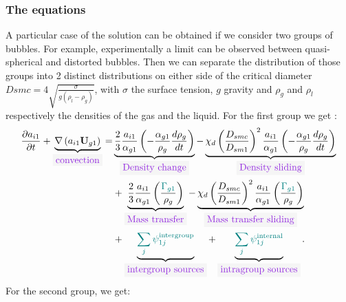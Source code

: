 \subsubsection{The equations}
A particular case of the solution can be obtained if we consider two groups of bubbles. For example, experimentally a limit can be observed between quasi-spherical and distorted bubbles. Then we can separate the distribution of those groups into 2 distinct distributions on either side of the critical diameter $Dsmc=4\sqrt{\tfrac{\sigma}{g(\rho_l-\rho_g)}}$, with $\sigma$ the surface tension, $g$ gravity and $\rho_g$ and $\rho_l$ respectively the densities of the gas and the liquid. For the first group we get :
\begin{equation}
\begin{aligned}
\frac{\partial a_{i1}}{\partial t}+\underbrace{\nabla\parent{a_{i1}\mathbf{U}_{g1}}}_{\colorbox{codebackground}{\color{codekeyword3} convection}}=&\underbrace{\frac{2}{3}\frac{a_{i1}}{\alpha_{g1}}\parent{-\frac{\alpha_{g1}}{\rho_g}\frac{d \rho_g}{dt}}}_{\colorbox{codebackground}{\color{codekeyword3} Density\ change}}-\underbrace{\chi_d\parent{\frac{D_{smc}}{D_{sm1}}}^2\frac{a_{i1}}{\alpha_{g1}}\parent{-\frac{\alpha_{g1}}{\rho_g}\frac{d \rho_g}{dt}}}_{\colorbox{codebackground}{\color{codekeyword3} Density\ sliding}}  \\
&+\underbrace{\frac{2}{3}\frac{a_{i1}}{\alpha_{g1}}\parent{\frac{\color{myteal}\Gamma_{g1}}{\rho_g}}}_{\colorbox{codebackground}{\color{codekeyword3} Mass\ transfer}}-\underbrace{\chi_d\parent{\frac{D_{smc}}{D_{sm1}}}^2\frac{a_{i1}}{\alpha_{g1}}\parent{\frac{\color{myteal}\Gamma_{g1}}{\rho_g}}}_{\colorbox{codebackground}{\color{codekeyword3} Mass\ transfer\ sliding}} \\
&+\underbrace{\color{myteal}\sum_j \psi^{\text{intergroup}}_{1j}}_{\colorbox{codebackground}{\color{codekeyword3} intergroup\ sources}}+\underbrace{\color{myteal}\sum_j \psi^{\text{internal}}_{1j}}_{\colorbox{codebackground}{\color{codekeyword3} intragroup sources}}.
\end{aligned}
\end{equation}
For the second group, we get:
